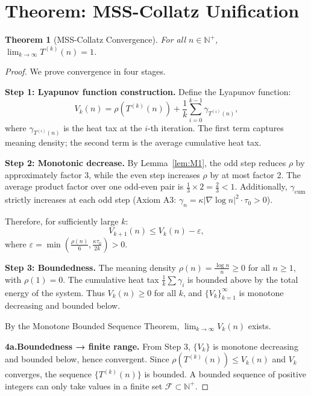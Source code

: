\documentclass[11pt,a4paper]{article}
\newtheorem{theorem}{Theorem}[section]
\begin{document}
\section{Theorem: MSS-Collatz Unification}
\label{sec:theorem}

\begin{theorem}[MSS-Collatz Convergence]\label{thm:main}
For all $n \in \mathbb{N}^+$, $\displaystyle\lim_{k\to\infty} T^{(k)}(n) = 1$.
\end{theorem}

\begin{proof}
We prove convergence in four stages.

\textbf{Step 1: Lyapunov function construction.}
Define the Lyapunov function:
\begin{equation}\label{eq:V}
V_k(n) = \rho(T^{(k)}(n)) + \frac{1}{k}\sum_{i=0}^{k-1} \gamma_{T^{(i)}(n)},
\end{equation}
where $\gamma_{T^{(i)}(n)}$ is the heat tax at the $i$-th iteration. The first term captures meaning density; the second term is the average cumulative heat tax.

\textbf{Step 2: Monotonic decrease.}
By Lemma~\ref{lem:M1}, the odd step reduces $\rho$ by approximately factor 3, while the even step increases $\rho$ by at most factor 2. The average product factor over one odd-even pair is $\frac{1}{3} \times 2 = \frac{2}{3} < 1$. Additionally, $\gamma_{\text{cum}}$ strictly increases at each odd step (Axiom A3: $\gamma_n = \kappa|\nabla\log n|^2\cdot\tau_0 > 0$).

Therefore, for sufficiently large $k$:
\begin{equation}
V_{k+1}(n) \le V_k(n) - \varepsilon,
\end{equation}
where $\varepsilon = \min\left(\frac{\rho(n)}{6}, \frac{\kappa\tau_0}{2k}\right) > 0$.

\textbf{Step 3: Boundedness.}
The meaning density $\rho(n) = \frac{\log n}{n} \ge 0$ for all $n\ge 1$, with $\rho(1)=0$. The cumulative heat tax $\frac{1}{k}\sum\gamma_i$ is bounded above by the total energy of the system. Thus $V_k(n) \ge 0$ for all $k$, and $\{V_k\}_{k=1}^{\infty}$ is monotone decreasing and bounded below.

By the Monotone Bounded Sequence Theorem, $\lim_{k\to\infty} V_k(n)$ exists.

\textbf{4a.\quad Boundedness → finite range.}
From Step 3, $\{V_k\}$ is monotone decreasing and bounded below, hence convergent. Since $\rho(T^{(k)}(n)) \le V_k(n)$ and $V_k$ converges, the sequence $\{T^{(k)}(n)\}$ is bounded. A bounded sequence of positive integers can only take values in a finite set $\mathcal{F} \subset \mathbb{N}^+$.


\end{proof}
\end{document}
